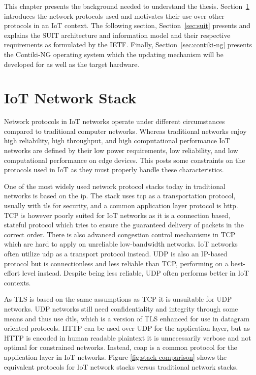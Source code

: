 \documentclass[0-thesis.tex]{subfiles}
\begin{document}
This chapter presents the background needed to understand the thesis.
Section~\ref{sec:network} introduces the network protocols used and motivates their use
over other protocols in an IoT context. The following section, Section~\ref{sec:suit}
presents and explains the SUIT architecture and information model and their respective
requirements as formulated by the IETF. Finally, Section~\ref{sec:contiki-ng} presents the
Contiki-NG operating system which the updating mechanism will be developed for as well as
the target hardware.

\section{IoT Network Stack}
\label{sec:network}
Network protocols in IoT networks operate under different circumstances compared to
traditional computer networks. Whereas traditional networks enjoy high reliability, high
throughput, and high computational performance IoT networks are defined by their low power
requirements, low reliability, and low computational performance on edge devices. This
posts some constraints on the protocols used in IoT as they must properly handle these
characteristics.

One of the most widely used network protocol stacks today in traditional networks is based
on the \gls{ip}. The stack uses \gls{tcp} as a transportation protocol, usually with
\gls{tls} for security, and a common application layer protocol is \gls{http}. TCP is
however poorly suited for IoT networks as it is a connection based, stateful protocol
which tries to ensure the guaranteed delivery of packets in the correct order. There is
also advanced congestion control mechanisms in TCP which are hard to apply on unreliable
low-bandwidth networks. IoT networks often utilize \gls{udp} as a transport protocol
instead. UDP is also an IP-based protocol but is connectionless and less reliable than
TCP, performing on a best-effort level instead. Despite being less reliable, UDP often
performs better in IoT contexts.

As TLS is based on the same assumptions as TCP it is unsuitable for UDP networks. UDP
networks still need confidentiality and integrity through some means and thus use
\gls{dtls}, which is a version of TLS enhanced for use in datagram oriented protocols.
HTTP can be used over UDP for the application layer, but as HTTP is encoded in human
readable plaintext it is unnecessarily verbose and not optimal for constrained networks.
Instead, \gls{coap} is a common protocol for the application layer in IoT networks. Figure
\ref{fig:stack-comparison} shows the equivalent protocols for IoT network stacks versus
traditional network stacks. 
\end{document}
